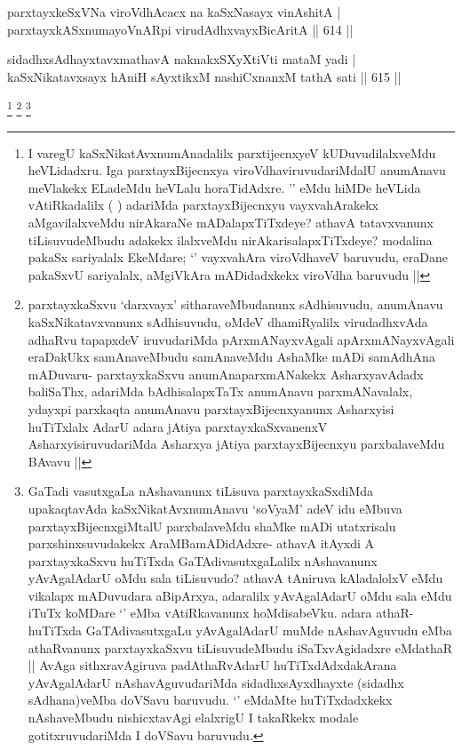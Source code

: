 
\begin{shl}
parxtayxkeSxVNa viroVdhAcacx na kaSxNasayx vinAshitA | \\
parxtayxkASxnumayoVnARpi virudAdhxvayxBicAritA \hfill||  614 ||  
\end{shl}
				
\begin{shl}
sidadhxsAdhayxtavxmathavA naknakxSXyXtiVti mataM yadi | \\
kaSxNikatavxsayx hAniH sAyxtikxM nashiCxnanxM tathA sati \hfill||  615 ||  
\end{shl}

\begin{artha}
\footnote{I varegU kaSxNikatAvxnumAnadalilx parxtijecnxyeV kUDuvudilalxveMdu heVLidadxru. Iga parxtayxBijecnxya viroVdhaviruvudariMdalU anumAnavu meVlakekx ELadeMdu heVLalu horaTidAdxre. '\stext' eMdu hiMDe heVLida vAtiRkadalilx (  ) adariMda parxtayxBijecnxyu vayxvahArakekx aMgavilalxveMdu nirAkaraNe mADalapxTiTxdeye? athavA tatavxvanunx tiLisuvudeMbudu adakekx ilalxveMdu nirAkarisalapxTiTxdeye? modalina pakaSx sariyalalx EkeMdare; `\stext' vayxvahAra viroVdhaveV baruvudu, eraDane pakaSxvU sariyalalx, aMgiVkAra mADidadxkekx viroVdha baruvudu ||}
\footnote{parxtayxkaSxvu `darxvayx' sitharaveMbudanunx sAdhisuvudu, anumAnavu kaSxNikatavxvanunx sAdhisuvudu, oMdeV dhamiRyalilx virudadhxvAda adhaRvu tapapxdeV iruvudariMda pArxmANayxvAgali apArxmANayxvAgali eraDakUkx samAnaveMbudu samAnaveMdu AshaMke mADi samAdhAna mADuvaru- parxtayxkaSxvu anumAnaparxmANakekx AsharxyavAdadx baliSaThx, adariMda bAdhisalapxTaTx anumAnavu parxmANavalalx, ydayxpi parxkaqta anumAnavu parxtayxBijecnxyanunx Asharxyisi huTiTxlalx AdarU adara jAtiya parxtayxkaSxvanenxV AsharxyisiruvudariMda Asharxya jAtiya parxtayxBijecnxyu parxbalaveMdu BAvavu ||}
\footnote{GaTadi vasutxgaLa nAshavanunx tiLisuva parxtayxkaSxdiMda upakaqtavAda kaSxNikatAvxnumAnavu `soV\s yaM' adeV idu eMbuva parxtayxBijecnxgiMtalU parxbalaveMdu shaMke mADi utatxrisalu parxshinxsuvudakekx AraMBamADidAdxre- athavA itAyxdi A parxtayxkaSxvu huTiTxda GaTAdivasutxgaLalilx nAshavanunx yAvAgalAdarU oMdu sala tiLisuvudo? athavA tAniruva kAladalolxV eMdu vikalapx mADuvudara aBipArxya, adaralilx yAvAgalAdarU oMdu sala eMdu iTuTx koMDare `\stext' eMba vAtiRkavanunx hoMdisabeVku. adara athaR- huTiTxda GaTAdivasutxgaLu yAvAgalAdarU muMde nAshavAguvudu eMba athaRvanunx parxtayxkaSxvu tiLisuvudeMbudu iSaTxvAgidadxre eMdathaR || AvAga sithxravAgiruva padAthaRvAdarU huTiTxdAdxdakArana yAvAgalAdarU nAshavAguvudariMda sidadhxsAyxdhayxte (sidadhx sAdhana)veMba doVSavu baruvudu. `\stext' eMdaMte huTiTxdadxkekx nAshaveMbudu nishicxtavAgi elalxrigU I takaRkekx modale gotitxruvudariMda I doVSavu baruvudu.}

\end{artha}

